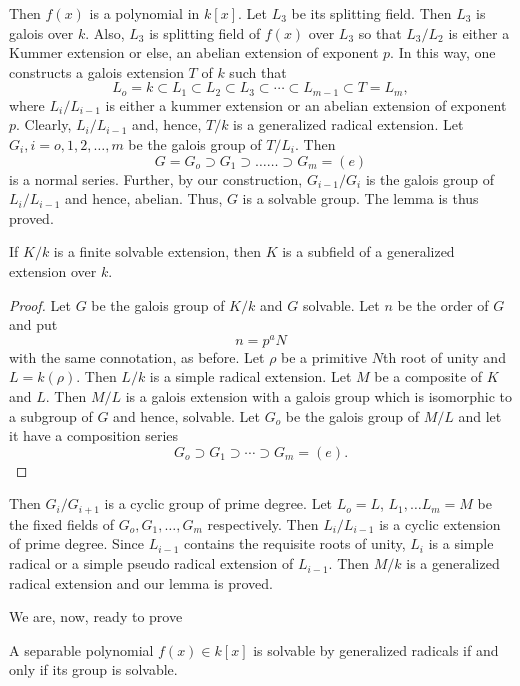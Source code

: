 Then $f(x)$ is a  polynomial in $k[x]$. Let $L_3$ be its splitting
field. Then $L_3$ is galois over $k$. Also, $L_3$ is splitting field
of $f(x)$  over $L_3$ so that $L_3 / L_2$ is either a Kummer extension
or else, an abelian extension of exponent $p$. In this way, one
constructs a galois extension $T$ of $k$ such that  
$$
L_o = k \subset L_1 \subset L_2 \subset L_3 \subset \cdots \subset
L_{m-1} \subset T = L_m, 
$$
where $L_i / L_{i - 1} $ is either a kummer extension or an abelian
extension of exponent $p$. Clearly, $L_i/L_{i-1}$ and, hence, $T/k$ is
a generalized radical extension. Let $G_i, i = o, 1, 2, \ldots , m$ be
the galois group of $T/L_i$. Then 
$$
G = G_o \supset G_1 \supset \ldots \ldots \supset G_m = (e)
$$
is a normal series. Further, by our construction, $G_{ i - 1} / G_i$
is the galois group of $L_i / L_{ i-1}$ and hence, abelian. Thus, $G$
is a solvable group. The lemma is thus proved.  

\begin{lem}\label{c6:lem2} %
If $K/k$ is a finite solvable extension, then $K$ is a subfield of a
generalized extension over $k$. 
\end{lem}

\begin{proof} %
Let $G$ be the galois group of $K/k$ and $G$ solvable. Let $n$ be the
order of $G$ and put  
$$
n=p^{a}N
$$\pageoriginale
with the same connotation, as before. Let $\rho$ be a primitive
$N$th root of unity and $L=k(\rho)$. Then $L/k$ is a simple radical
extension. Let $M$ be a composite of $K$ and $L$. Then $M/L$ is
a galois extension with a galois group which is isomorphic to a
subgroup of $G$ and hence, solvable. Let $G_o$ be the galois group of
$M/L$ and let it have a composition series  
$$
G_o \supset G_1 \supset \cdots \supset G_m=(e).
$$
\end{proof}

Then $G_i/G_{i+1}$ is a cyclic group of prime degree. Let $L_o=L$,
$L_1, \ldots L_m=M$ be the fixed fields of $G_o,G_1, \ldots,G_m$
respectively. Then $L_i/L_{i-1}$ is a cyclic extension of prime
degree. Since $L_{i-1}$ contains the requisite roots of unity, $L_i$
is a simple radical or a simple pseudo radical extension of
$L_{i-1}$. Then $M/k$ is a generalized radical extension and our lemma
is proved. 

We are, now, ready to prove 

\begin{thm}\label{c6:thm16} %
 A separable polynomial $f(x) \in k[x]$ is solvable by generalized
 radicals if and only if its group is solvable. 
\end{thm}

